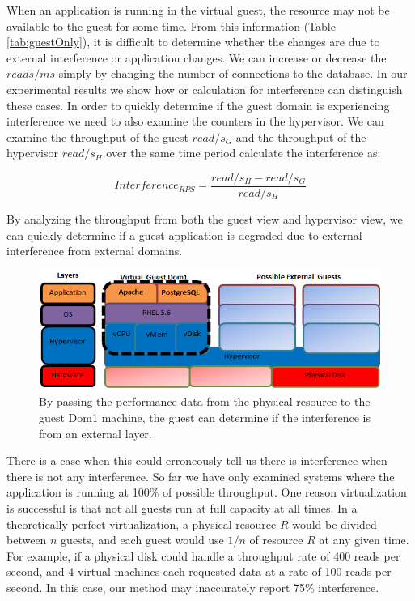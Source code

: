 When an application is running in the virtual guest, the resource may not be available to the guest for some time.  From this information (Table \ref{tab:guestOnly}), it is difficult to determine whether the changes are due to external interference or application changes. We can increase or decrease the $reads/ms$ simply by changing the number of connections to the database.  In our experimental results we show how or calculation for interference can distinguish these cases.  In order to quickly determine if the guest domain is experiencing interference we need to also examine the counters in the hypervisor.  We can examine the throughput of the guest $read/s_G$ and the throughput of the hypervisor $read/s_H$ over the same time period calculate the interference as:

\begin{equation}
	Interference_{RPS} = \frac{read/s_H - read/s_G}{read/s_H} 
\end{equation}

By analyzing the throughput from both the guest view and hypervisor view, we can quickly determine if a guest application is degraded due to external interference from external domains.  

\begin{figure}[!h]
  \begin{center}
  \includegraphics[width=6in]{images/LayersVirtualWithDisk.png}
  \caption{By passing the performance data from the physical resource to the guest Dom1 machine, the guest can determine if the interference is from an external layer.} 
  \label{LayersAndResources}
  \end{center}
\end{figure}

There is a case when this could erroneously tell us there is interference when there is not any interference.  So far we have only examined systems where the application is running at 100\% of possible throughput.  One reason virtualization is successful is that not all guests run at full capacity at all times.  In a theoretically perfect virtualization, a physical resource $R$ would be divided between $n$ guests, and each guest would use $1/n$ of resource $R$ at any given time.  For example, if a physical disk could handle a throughput rate of 400 reads per second, and 4 virtual machines each requested data at a rate of 100 reads per second. In this case, our method may inaccurately report 75\% interference.  

